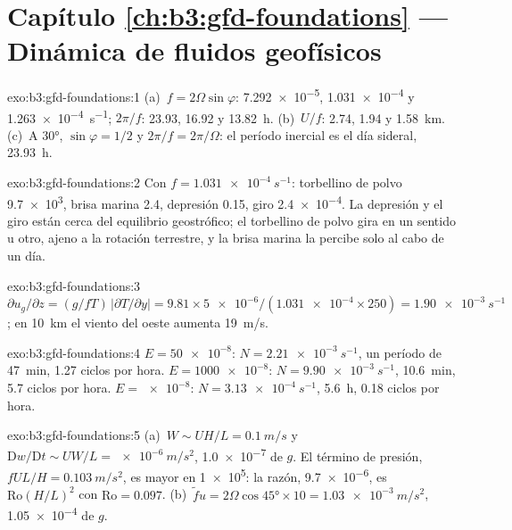 \section*{Capítulo \ref{ch:b3:gfd-foundations} --- Dinámica de fluidos geofísicos}

\begin{solution}{exo:b3:gfd-foundations:1}
(a)~$f = 2\Omega\sin\varphi$: \num{7.292e-5}, \num{1.031e-4} y
\qty{1.263e-4}{s^{-1}}; $2\pi/f$: 23.93, 16.92 y \qty{13.82}{h}.
(b)~$U/f$: 2.74, 1.94 y \qty{1.58}{km}. (c)~A \ang{30}, $\sin\varphi =
1/2$ y $2\pi/f = 2\pi/\Omega$: el período inercial es el día sideral,
\qty{23.93}{h}.
\end{solution}

\begin{solution}{exo:b3:gfd-foundations:2}
Con $f = \qty{1.031e-4}{s^{-1}}$: torbellino de polvo \num{9.7e3}, brisa marina 2.4,
depresión 0.15, giro \num{2.4e-4}. La depresión y el giro están cerca del
equilibrio geostrófico; el torbellino de polvo gira en un sentido u otro, ajeno
a la rotación terrestre, y la brisa marina la percibe solo al cabo de un día.
\end{solution}

\begin{solution}{exo:b3:gfd-foundations:3}
$\partial u_g/\partial z = (g/fT)\,|\partial T/\partial y| = 9.81\times
\num{5e-6}/(\num{1.031e-4}\times250) = \qty{1.90e-3}{s^{-1}}$; en
\qty{10}{km} el viento del oeste aumenta \qty{19}{m/s}.
\end{solution}

\begin{solution}{exo:b3:gfd-foundations:4}
$E = \num{50e-8}$: $N = \qty{2.21e-3}{s^{-1}}$, un período de \qty{47}{min},
\num{1.27} ciclos por hora. $E = \num{1000e-8}$: $N = \qty{9.90e-3}{s^{-1}}$,
\qty{10.6}{min}, 5.7 ciclos por hora. $E = \num{e-8}$: $N =
\qty{3.13e-4}{s^{-1}}$, \qty{5.6}{h}, 0.18 ciclos por hora.
\end{solution}

\begin{solution}{exo:b3:gfd-foundations:5}
(a)~$W \sim UH/L = \qty{0.1}{m/s}$ y $\mathrm Dw/\mathrm Dt \sim UW/L =
\qty{e-6}{m/s^2}$, \num{1.0e-7} de $g$. El término de presión, $fUL/H =
\qty{0.103}{m/s^2}$, es mayor en \num{1e5}: la razón, \num{9.7e-6}, es
$\mathrm{Ro}(H/L)^2$ con $\mathrm{Ro} = 0.097$. (b)~$\tilde fu =
2\Omega\cos\ang{45}\times10 = \qty{1.03e-3}{m/s^2}$, \num{1.05e-4} de $g$.
\end{solution}

